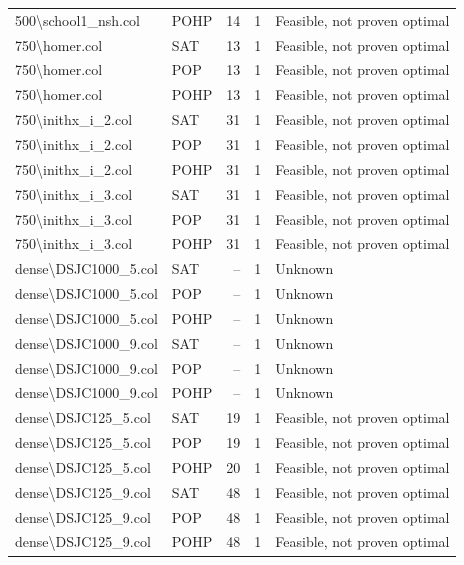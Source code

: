 \begin{longtable}{llrrl}
500\textbackslash{}school1\_nsh.col & POHP & 14 & 1 & Feasible, not proven optimal \\
750\textbackslash{}homer.col & SAT & 13 & 1 & Feasible, not proven optimal \\
750\textbackslash{}homer.col & POP & 13 & 1 & Feasible, not proven optimal \\
750\textbackslash{}homer.col & POHP & 13 & 1 & Feasible, not proven optimal \\
750\textbackslash{}inithx\_i\_2.col & SAT & 31 & 1 & Feasible, not proven optimal \\
750\textbackslash{}inithx\_i\_2.col & POP & 31 & 1 & Feasible, not proven optimal \\
750\textbackslash{}inithx\_i\_2.col & POHP & 31 & 1 & Feasible, not proven optimal \\
750\textbackslash{}inithx\_i\_3.col & SAT & 31 & 1 & Feasible, not proven optimal \\
750\textbackslash{}inithx\_i\_3.col & POP & 31 & 1 & Feasible, not proven optimal \\
750\textbackslash{}inithx\_i\_3.col & POHP & 31 & 1 & Feasible, not proven optimal \\
dense\textbackslash{}DSJC1000\_5.col & SAT & -- & 1 & Unknown \\
dense\textbackslash{}DSJC1000\_5.col & POP & -- & 1 & Unknown \\
dense\textbackslash{}DSJC1000\_5.col & POHP & -- & 1 & Unknown \\
dense\textbackslash{}DSJC1000\_9.col & SAT & -- & 1 & Unknown \\
dense\textbackslash{}DSJC1000\_9.col & POP & -- & 1 & Unknown \\
dense\textbackslash{}DSJC1000\_9.col & POHP & -- & 1 & Unknown \\
dense\textbackslash{}DSJC125\_5.col & SAT & 19 & 1 & Feasible, not proven optimal \\
dense\textbackslash{}DSJC125\_5.col & POP & 19 & 1 & Feasible, not proven optimal \\
dense\textbackslash{}DSJC125\_5.col & POHP & 20 & 1 & Feasible, not proven optimal \\
dense\textbackslash{}DSJC125\_9.col & SAT & 48 & 1 & Feasible, not proven optimal \\
dense\textbackslash{}DSJC125\_9.col & POP & 48 & 1 & Feasible, not proven optimal \\
dense\textbackslash{}DSJC125\_9.col & POHP & 48 & 1 & Feasible, not proven optimal \\

\end{longtable}
